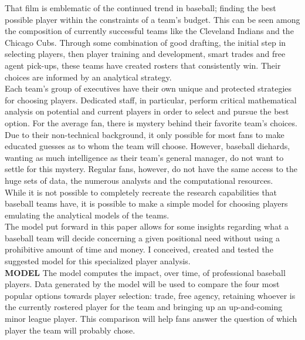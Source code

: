 \documentclass[12pt]{article}
\begin{document}
That film is emblematic of the continued trend in baseball; finding the best possible player within the constraints of a team's budget.  This can be seen among the composition of currently successful teams like the Cleveland Indians and the Chicago Cubs.  Through some combination of good drafting, the initial step in selecting players,  then player training and development, smart trades and free agent pick-ups, these teams have created rosters that consistently win.  Their choices are informed by an analytical strategy.  \\

Each team's group of executives have their own unique and protected strategies for choosing players.  Dedicated staff, in particular, perform critical mathematical analysis on potential and current players in order to select and pursue the best option.  For the average fan, there is mystery behind their favorite team's choices.  Due to their non-technical background, it only possible for most fans to make educated guesses as to whom the team will choose.  However, baseball diehards, wanting as much intelligence as their team's general manager, do not want to settle for this mystery.  Regular fans, however, do not have the same access to the huge sets of data, the numerous analysts and the computational resources.\\

While it is not possible to completely recreate the research capabilities that baseball teams have, it is possible to make a simple model for choosing players emulating the analytical models of the teams.  \\

The model put forward in this paper allows for some insights regarding what a baseball team will decide concerning a given positional need without using a prohibitive amount of time and money.  I conceived, created and tested the suggested model for this specialized player analysis. \\
\vskip 2pt
\textbf{MODEL}
\vskip 2pt
The model computes the impact, over time, of professional baseball players.  Data generated by the model will be used to compare the four most popular options towards player selection: trade, free agency, retaining whoever is the currently rostered player for the team and bringing up an up-and-coming minor league player.  This comparison will help fans answer the question of which player the team will probably chose.  \\
\end{document}
